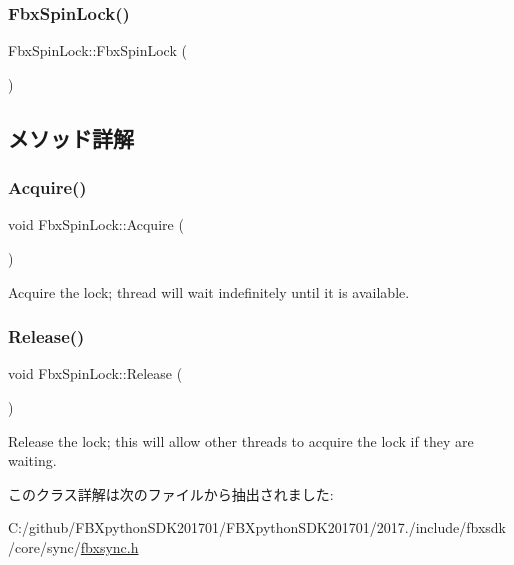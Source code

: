 \subsubsection{\texorpdfstring{Fbx\+Spin\+Lock()}{FbxSpinLock()}}
{\footnotesize\ttfamily Fbx\+Spin\+Lock\+::\+Fbx\+Spin\+Lock (\begin{DoxyParamCaption}{ }\end{DoxyParamCaption})}



\subsection{メソッド詳解}
\mbox{\label{class_fbx_spin_lock_a6f5aa93e51e6bd4717337bfb2216c371}} 
\subsubsection{\texorpdfstring{Acquire()}{Acquire()}}
{\footnotesize\ttfamily void Fbx\+Spin\+Lock\+::\+Acquire (\begin{DoxyParamCaption}{ }\end{DoxyParamCaption})}

Acquire the lock; thread will wait indefinitely until it is available. \mbox{\label{class_fbx_spin_lock_a3cc819cf0168dfc482696650b32c07f6}} 
\subsubsection{\texorpdfstring{Release()}{Release()}}
{\footnotesize\ttfamily void Fbx\+Spin\+Lock\+::\+Release (\begin{DoxyParamCaption}{ }\end{DoxyParamCaption})}

Release the lock; this will allow other threads to acquire the lock if they are waiting. 

このクラス詳解は次のファイルから抽出されました\+:\begin{DoxyCompactItemize}
\item 
C\+:/github/\+F\+B\+Xpython\+S\+D\+K201701/\+F\+B\+Xpython\+S\+D\+K201701/2017./include/fbxsdk/core/sync/\hyperlink{fbxsync_8h}{fbxsync.\+h}\end{DoxyCompactItemize}
